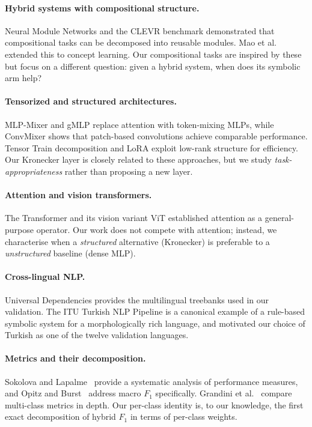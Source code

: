 \documentclass[11pt,a4paper]{article}
\begin{document}
\paragraph{Hybrid systems with compositional structure.}
Neural Module Networks \cite{andreas2016neural} and the CLEVR
benchmark \cite{johnson2017clevr} demonstrated that compositional
tasks can be decomposed into reusable modules. Mao et
al.~\cite{mao2019neuro} extended this to concept learning. Our
compositional tasks are inspired by these but focus on a different
question: given a hybrid system, when does its symbolic arm help?

\paragraph{Tensorized and structured architectures.}
MLP-Mixer \cite{tolstikhin2021mlp} and gMLP \cite{liu2021gmlp}
replace attention with token-mixing MLPs, while ConvMixer
\cite{trockman2023patches} shows that patch-based convolutions achieve
comparable performance. Tensor Train decomposition
\cite{novikov2015tensor} and LoRA \cite{hu2021lora} exploit low-rank
structure for efficiency. Our Kronecker layer is closely related to
these approaches, but we study \emph{task-appropriateness} rather
than proposing a new layer.

\paragraph{Attention and vision transformers.}
The Transformer \cite{vaswani2017attention} and its vision variant ViT
\cite{dosovitskiy2020vit} established attention as a general-purpose
operator. Our work does not compete with attention; instead, we
characterise when a \emph{structured} alternative (Kronecker) is
preferable to a \emph{unstructured} baseline (dense MLP).

\paragraph{Cross-lingual NLP.}
Universal Dependencies \cite{nivre2020ud} provides the multilingual
treebanks used in our validation. The ITU Turkish NLP Pipeline
\cite{eryigit2015itu} is a canonical example of a rule-based symbolic
system for a morphologically rich language, and motivated our choice
of Turkish as one of the twelve validation languages.

\paragraph{Metrics and their decomposition.}
Sokolova and Lapalme~\cite{sokolova2009systematic} provide a
systematic analysis of performance measures, and Opitz and
Burst~\cite{opitz2019macro} address macro $F_1$ specifically.
Grandini et al.~\cite{grandini2020metrics} compare multi-class metrics
in depth. Our per-class identity is, to our knowledge, the first
exact decomposition of hybrid $F_1$ in terms of per-class weights.
\end{document}
